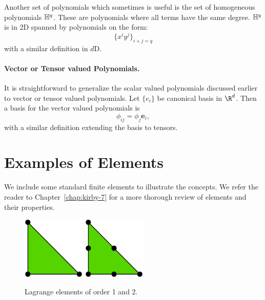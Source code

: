 Another set of polynomials which sometimes is useful is the set
of homogeneous polynomials ${\mathbb H}^q$. These are polynomials where all terms
have the same degree. ${\mathbb H}^q$ is in 2D spanned by polynomials on the
form:
\begin{equation}
\{ x^i y^j \}_{i+j=q} 
\end{equation}
with a similar definition in $d$D.



\paragraph{Vector or Tensor valued Polynomials.}
It is straightforward to generalize the scalar valued polynomials discussed
earlier to vector or tensor valued polynomials. Let $\{e_i\}$ be canonical
basis in $\R^d$. Then a basis for the vector valued polynomials is
\[
\phi_{ij} = \phi_j \mathbf{e}_i,
\]
with a similar definition extending the basis to tensors.


\section{Examples of Elements}

We include some standard finite elements to illustrate the concepts. 
We refer the reader to Chapter~\ref{chap:kirby-7} for a more thorough review of
elements and their properties. 

\begin{figure}
  \begin{center}
    \includegraphics[height=3cm]{chapters/kirby-6/pdf/P1.pdf} \hspace{1.0cm}
    \includegraphics[height=3cm]{chapters/kirby-6/pdf/P2.pdf} \hspace{1.0cm}
    \caption{Lagrange elements of order 1 and 2.}
    \label{Lagrange}
  \end{center}
\end{figure}


